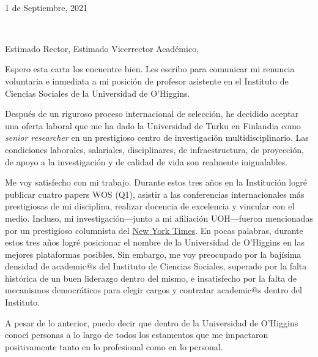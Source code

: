 \documentclass[11pt, a4paper]{letter} %
\renewcommand{\opening}[1]{
	{\centering\fromaddress\vspace{0.05\textheight} \\ %
	1 de Septiembre, 2021\hspace*{\fill}\par} %
	{\raggedright \toname \\ \toaddress \par} %
	\vspace{1cm} %
	\noindent #1 %
}
\begin{document}

\begin{letter}{
}


\opening{Estimado Rector, Estimado Vicerrector Acad\'emico,}

Espero esta carta los encuentre bien. Les escribo para comunicar mi renuncia voluntaria e inmediata a mi posici\'on de profesor asistente en el Instituto de Ciencias Sociales de la Universidad de O'Higgins.

Despu\'es de un riguroso proceso internacional de selecci\'on, he decidido aceptar una oferta laboral que me ha dado la Universidad de Turku en Finlandia como \emph{senior researcher} en un prestigioso centro de investigaci\'on multidisciplinario. Las condiciones laborales, salariales, disciplinares, de infraestructura, de proyecci\'on, de apoyo a la investigaci\'on y de calidad de vida son realmente inigualables. 

Me voy satisfecho con mi trabajo. Durante estos tres a\~nos en la Instituci\'on logr\'e publicar cuatro papers WOS (Q1), asistir a las conferencias internacionales m\'as prestigiosas de mi disciplina, realizar docencia de excelencia y vincular con el medio. Incluso, mi investigaci\'on---junto a mi afiliaci\'on UOH---fueron mencionadas por un prestigioso columnista del \href{https://www.nytimes.com/2021/08/04/opinion/biden-eviction-covid-democrats.html?smid=tw-share}{New York Times}. En pocas palabras, durante estos tres a\~nos logr\'e posicionar el nombre de la Universidad de O'Higgins en las mejores plataformas posibles. Sin embargo, me voy preocupado por la baj\'isima densidad de academic$@$s del Instituto de Ciencias Sociales, superado por la falta hist\'orica de un buen liderazgo dentro del mismo, e insatisfecho por la falta de mecanismos democr\'aticos para elegir cargos y contratar academic$@$s dentro del Instituto.


A pesar de lo anterior, puedo decir que dentro de la Universidad de O'Higgins conoc\'i personas a lo largo de todos los estamentos que me impactaron positivamente tanto en lo profesional como en lo personal. 


\end{letter}
\end{document}
